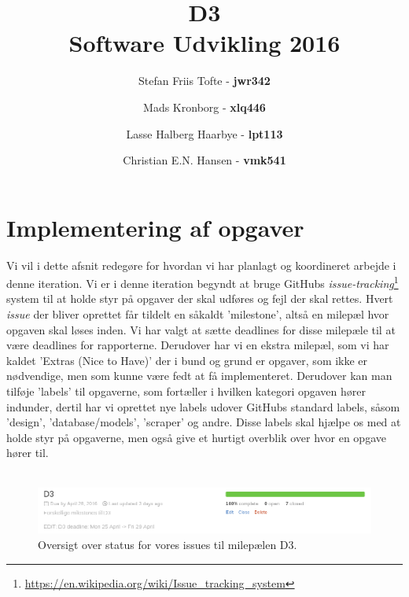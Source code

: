 \documentclass[11pt]{article}
\title{
  \vspace{3cm}
  \Huge{D3} \\
  \Large{Software Udvikling 2016}
}
\author{
	\Large{Stefan Friis Tofte} - \textbf{jwr342}%
	\and
	\Large{Mads Kronborg} - \textbf{xlq446}%
	\and
	\Large{Lasse Halberg Haarbye} - \textbf{lpt113}%
	\and
	\Large{Christian E.N. Hansen} - \textbf{vmk541}%
}
\def \ColourPDF {../include/ku-farve}
\def \TitlePDF {../include/ku-en}  %
\begin{document}


\clearpage\maketitle
\thispagestyle{empty}

\newpage
\tableofcontents
\newpage

\section{Implementering af opgaver}
Vi vil i dette afsnit redegøre for hvordan vi har planlagt og koordineret arbejde i denne iteration. Vi er i denne iteration begyndt at bruge GitHubs \textit{issue-tracking}\footnote{\url{https://en.wikipedia.org/wiki/Issue_tracking_system}} system til at holde styr på opgaver der skal udføres og fejl der skal rettes. Hvert \textit{issue} der bliver oprettet får tildelt en såkaldt 'milestone', altså en milepæl hvor opgaven skal løses inden. Vi har valgt at sætte deadlines for disse milepæle til at være deadlines for rapporterne. Derudover har vi en ekstra milepæl, som vi har kaldet 'Extras (Nice to Have)' der i bund og grund er opgaver, som ikke er nødvendige, men som kunne være fedt at få implementeret. Derudover kan man tilføje 'labels' til opgaverne, som fortæller i hvilken kategori opgaven hører indunder, dertil har vi oprettet nye labels udover GitHubs standard labels, såsom 'design', 'database/models', 'scraper' og andre. Disse labels skal hjælpe os med at holde styr på opgaverne, men også give et hurtigt overblik over hvor en opgave hører til. \\ \\

\begin{figure}[H]
	\centering
	\includegraphics[scale=0.5]{issues.png}
	\caption{Oversigt over status for vores issues til milepælen D3.}
	\label{fig:issues}
\end{figure}
\end{document}
